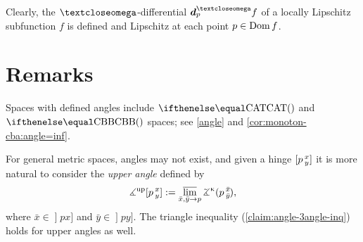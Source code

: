 Clearly, the $\o$-differential $\dd_p^\o f$ of a locally Lipschitz subfunction $f$ is defined and Lipschitz at each point $p\in \Dom f$.


\section{Remarks}
\label{page:upper-angle}


Spaces with defined angles include $\CAT{}{}$ and $\Alex{}{}$ spaces;
see \ref{angle} and \ref{cor:monoton-cba:angle=inf}.

For general metric spaces, angles may not exist, 
and given a hinge $[p\,{}^{x}_{y}]$  it is more natural to consider the \emph{upper angle}  defined by
\[\mangle^\text{up}\hinge p x y
\df
\limsup_{\bar x,\bar y\to p} \angk\kappa p{\bar x}{\bar y},\]
where $\bar x\in\mathopen{]}p x]$ and $\bar y\in\mathopen{]}p y]$.
The triangle inequality (\ref{claim:angle-3angle-inq}) holds for upper angles as well.
